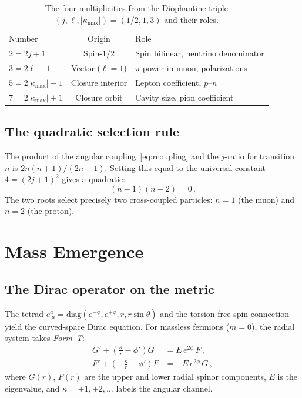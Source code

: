 \documentclass[aps,prd,twocolumn,superscriptaddress,nofootinbib,longbibliography]{revtex4-2}
\newcommand{\kmax}{|\kappa_{\mathrm{max}}|}
\begin{document}
\begin{table}[b]
\caption{\label{tab:multiplicities}%
The four multiplicities from the Diophantine triple
$(j, \ell, \kmax) = (1/2, 1, 3)$ and their roles.}
\begin{ruledtabular}
\begin{tabular}{lcl}
Number & Origin & Role \\
\colrule
$2 = 2j+1$ & Spin-$1/2$ & Spin bilinear, neutrino denominator \\
$3 = 2\ell+1$ & Vector ($\ell\!=\!1$) & $\pi$-power in muon, polarizations \\
$5 = 2\kmax-1$ & Closure interior & Lepton coefficient, $p$--$n$ \\
$7 = 2\kmax+1$ & Closure orbit & Cavity size, pion coefficient \\
\end{tabular}
\end{ruledtabular}
\end{table}

\subsection{The quadratic selection rule}

The product of the angular coupling~\eqref{eq:rcoupling} and the
$j$-ratio for transition $n$ is $2n(n+1)/(2n-1)$.  Setting this
equal to the universal constant $4 = (2j+1)^2$ gives a quadratic:
\begin{equation}\label{eq:quadratic}
  (n-1)(n-2) = 0\,.
\end{equation}
The two roots select precisely two cross-coupled particles:
$n = 1$ (the muon) and $n = 2$ (the proton).

\section{Mass Emergence}\label{sec:mass}

\subsection{The Dirac operator on the metric}

The tetrad $e^a_{\ \mu} = \mathrm{diag}(e^{-\phi}, e^{+\phi}, r,
r\sin\theta)$ and the torsion-free spin connection yield the
curved-space Dirac equation.  For massless fermions ($m = 0$), the
radial system takes \emph{Form~T}:
\begin{align}\label{eq:formT}
  G' + \!\left(\frac{\kappa}{r} - \phi'\right)\!G
    &= E\,e^{2\phi}\,F\,, \nonumber\\
  F' + \!\left(-\frac{\kappa}{r} - \phi'\right)\!F
    &= -E\,e^{2\phi}\,G\,,
\end{align}
where $G(r)$, $F(r)$ are the upper and lower radial spinor components,
$E$ is the eigenvalue, and $\kappa = \pm 1, \pm 2, \ldots$ labels the
angular channel.
\end{document}
